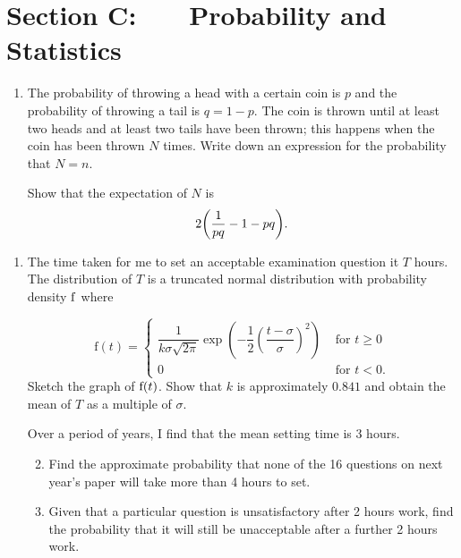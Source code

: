 \documentclass[a4, 11pt]{report}
\newlength{\qspace}
\newcounter{qnumber}
\newenvironment{question}%
 {\vspace{\qspace}
  \begin{enumerate}[\bfseries 1\quad][10]%
    \setcounter{enumi}{\value{qnumber}}%
    \item%
 }
{
  \end{enumerate}
  \filbreak
  \stepcounter{qnumber}
 }
\newenvironment{questionparts}[1][1]%
 {
  \begin{enumerate}[\bfseries (i)]%
    \setcounter{enumii}{#1}
    \addtocounter{enumii}{-1}
    \setlength{\itemsep}{5mm}
    \setlength{\parskip}{8pt}
 }
 {
  \end{enumerate}
 }
\def\f{{\rm f}}
\begin{document}
	
	\newpage
\section*{Section C: \ \ \ Probability and Statistics}


\begin{question}
The probability of throwing a head with a certain coin is $p$ and
the probability of throwing a tail is $q=1-p$. 
The coin is thrown until at least two heads and at least two tails have
been thrown; this happens when the coin has been thrown $N$ times.
Write down an expression for the probability that $N=n$.
                                                  
Show that the expectation of $N$ is 
$$
2\bigg({1\over pq} -1-pq\bigg).
$$  
\end{question}

\begin{question}
The time taken for me to set an acceptable examination question it $T$
hours. The distribution of $T$ is a truncated normal distribution with
probability density $\f$  where

\[
\mathrm{f}(t)=\begin{cases}
\dfrac{1}{k\sigma\sqrt{2\pi}}\exp\left(-\dfrac{1}{2}\left(\dfrac{t-\sigma}{\sigma}\right)^{2}\right) & \mbox{ for }t\geqslant0\\
0 & \mbox{ for }t<0.
\end{cases}
\]
Sketch the graph of $\f(t)$. Show that $k$ is approximately $0.841$
 and obtain the mean of $T$ as a multiple of
$\sigma$.

Over a period of years, I find that the mean setting time is 3 hours.
 \begin{questionparts}                  
\item Find the approximate probability that none of the 16
questions on next year's paper will take more than 4 hours to set.
                       
\item Given that a particular question is unsatisfactory after 2 hours work, 
find the probability that it will still be unacceptable after a further
2 hours work.
\end{questionparts}

\end{question}
\end{document}
